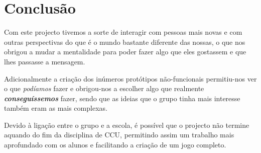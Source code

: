 \chapter{Conclusão}
\label{chap:concl}
Com este projecto tivemos a sorte de interagir com pessoas mais novas e com outras perspectivas do que é o mundo bastante diferente das nossas, o que nos obrigou a mudar a mentalidade para poder fazer algo que eles gostassem e que lhes passasse a mensagem.

Adicionalmente a criação dos inúmeros protótipos não-funcionais permitiu-nos ver o que \emph{podíamos} fazer e obrigou-nos a escolher algo que realmente \textbf{\emph{conseguíssemos}} fazer, sendo que as ideias que o grupo tinha mais interesse também eram as mais complexas.

Devido à ligação entre o grupo e a escola, é possível que o projecto não termine aquando do fim da disciplina de \ac{CCU}, permitindo assim um trabalho mais aprofundado com os alunos e facilitando a criação de um jogo completo.